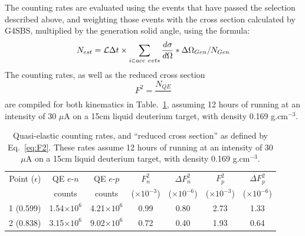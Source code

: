 The counting rates are evaluated using the events that have passed the selection described above, and weighting those events with the cross section calculated by G4SBS, multiplied by the generation solid angle, using the formula:
%
\begin{equation}
  N_{est} = {\cal L} \Delta t \times \sum_{i \in acc~evts} \frac{d\sigma}{d\Omega} *\Delta\Omega_{Gen} /N_{Gen}
\end{equation}
%
The counting rates, as well as the reduced cross section
%
\begin{equation}
  F^2 = \frac{N_{QE}}{}
\end{equation}
%
are compiled for both kinematics in Table.~\ref{tab:Rates}, assuming 12 hours of running at an intensity of 30 $\mu$A on a 15cm liquid deuterium target, with density 0.169 g.cm$^{-3}$.
%
\begin{center}
\begin{table}[h]
\begin{tabular}{|c|c|c|c|c|c|c|}
\hline
Point ($\epsilon$) & QE $e$-$n$ & QE $e$-$p$ & $F^2_n$ & $\Delta F^2_n$ & $F^2_p$ & $\Delta F^2_p$ \\
 & counts & counts & ($\times 10^{-3}$) & ($\times 10^{-6}$) & ($\times 10^{-3}$) & ($\times 10^{-6}$) \\
\hline
1 (0.599) & 1.54$\times 10^{6}$ & 4.21$\times 10^{6}$ & 0.99 & 0.80 & 2.73 & 1.33 \\
\hline
2 (0.838) & 3.15$\times 10^{6}$ & 9.02$\times 10^{6}$ & 0.72 & 0.40 & 1.93 & 0.64 \\
\hline
\end{tabular} 
\caption{Quasi-elastic counting rates, and ``reduced cross section'' as defined by Eq.~\ref{eq:F2}. These rates assume 12 hours of running at an intensity of 30 $\mu$A on a 15cm liquid deuterium target, with density 0.169 g.cm$^{-3}$.}%
\label{tab:Rates}
\end{table}
\end{center}
%

